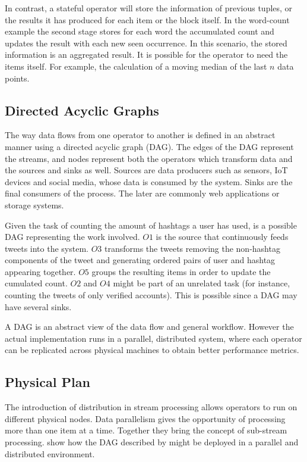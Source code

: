   In contrast, a stateful operator will store the information of previous
  tuples, or the results it has produced for each item or the block itself. In
  the word-count example the second stage stores for each word the accumulated
  count and updates the result with each new seen occurrence. In this scenario,
  the stored information is an aggregated result. It is possible for the
  operator to need the items itself. For example, the calculation of a moving
  median of the last $n$ data points.

  \subsection{Directed Acyclic Graphs}
  The way data flows from one operator to another is defined in an abstract
  manner using a directed acyclic graph (DAG). The edges of the DAG represent
  the streams, and nodes represent both the operators which transform data and
  the sources and sinks as well. Sources are data producers such as sensors,
  IoT devices and social media, whose data is consumed by the system. Sinks are
  the final consumers of the process. The later are commonly web applications
  or storage systems.


  Given the task of counting the amount of hashtags a user has used,
   is a possible DAG representing the work involved. $O1$ is the
  source that continuously feeds tweets into the system. $O3$ transforms the
  tweets removing the non-hashtag components of the tweet and generating
  ordered pairs of user and hashtag appearing together. $O5$ groups the
  resulting items in order to update the cumulated count. $O2$ and $O4$ might
  be part of an unrelated task (for instance, counting the tweets of only
  verified accounts). This is possible since a DAG may have several sinks.

  A DAG is an abstract view of the data flow and general workflow. However the
  actual implementation runs in a parallel, distributed system, where each
  operator can be replicated across physical machines to obtain better
  performance metrics.

  \subsection{Physical Plan}
  The introduction of distribution in stream processing allows operators to run
  on different physical nodes. Data parallelism gives the opportunity of
  processing more than one item at a time. Together they bring the concept of
  sub-stream processing.  show how the DAG described by
   might be deployed in a parallel and distributed environment.

